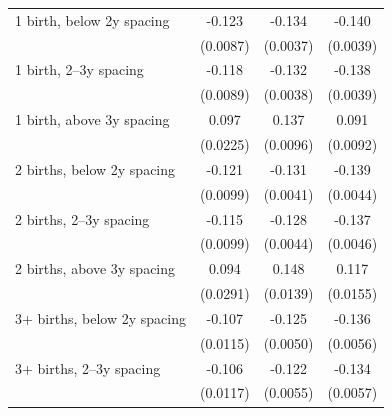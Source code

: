 {\begin{tabular}{l*{3}{c}}
\addlinespace
\hspace*{1em}1 birth, below 2y spacing&      -0.123\sym{***}&      -0.134\sym{***}&      -0.140\sym{***}\\
                    &    (0.0087)         &    (0.0037)         &    (0.0039)         \\
\addlinespace
\hspace*{1em}1 birth, 2–3y spacing&      -0.118\sym{***}&      -0.132\sym{***}&      -0.138\sym{***}\\
                    &    (0.0089)         &    (0.0038)         &    (0.0039)         \\
\addlinespace
\hspace*{1em}1 birth, above 3y spacing&       0.097\sym{***}&       0.137\sym{***}&       0.091\sym{***}\\
                    &    (0.0225)         &    (0.0096)         &    (0.0092)         \\
\addlinespace
\hspace*{1em}2 births, below 2y spacing&      -0.121\sym{***}&      -0.131\sym{***}&      -0.139\sym{***}\\
                    &    (0.0099)         &    (0.0041)         &    (0.0044)         \\
\addlinespace
\hspace*{1em}2 births, 2–3y spacing&      -0.115\sym{***}&      -0.128\sym{***}&      -0.137\sym{***}\\
                    &    (0.0099)         &    (0.0044)         &    (0.0046)         \\
\addlinespace
\hspace*{1em}2 births, above 3y spacing&       0.094\sym{**} &       0.148\sym{***}&       0.117\sym{***}\\
                    &    (0.0291)         &    (0.0139)         &    (0.0155)         \\
\addlinespace
\hspace*{1em}3+ births, below 2y spacing&      -0.107\sym{***}&      -0.125\sym{***}&      -0.136\sym{***}\\
                    &    (0.0115)         &    (0.0050)         &    (0.0056)         \\
\addlinespace
\hspace*{1em}3+ births, 2–3y spacing&      -0.106\sym{***}&      -0.122\sym{***}&      -0.134\sym{***}\\
                    &    (0.0117)         &    (0.0055)         &    (0.0057)         \\

\end{tabular}}
